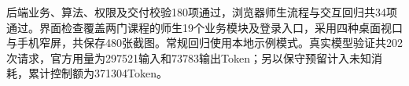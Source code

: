 后端业务、算法、权限及交付校验180项通过，浏览器师生流程与交互回归共34项通过。界面检查覆盖两门课程的师生19个业务模块及登录入口，采用四种桌面视口与手机窄屏，共保存480张截图。常规回归使用本地示例模式。真实模型验证共202次请求，官方用量为297521输入和73783输出Token；另以保守预留计入未知消耗，累计控制额为371304Token。
